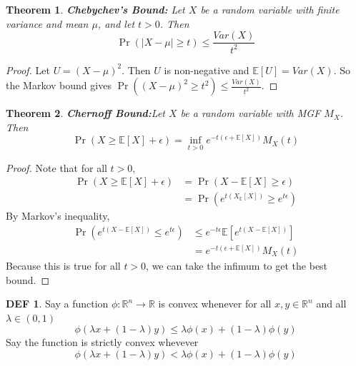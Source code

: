 \documentclass{article}
\newtheorem{theorem}{Theorem}
\theoremstyle{definition}\newtheorem{definition}{DEF}
\theoremstyle{definition}\newtheorem{example}{Ex}
\theoremstyle{lemma}\newtheorem{lemma}{Lemma}
\theoremstyle{corrolary}\newtheorem{corrolary}{Cor}
\begin{document}
\begin{theorem}
\textbf{Chebychev's Bound:}
Let $X$ be a random variable with finite variance and mean $\mu$, and let $t>0$.
Then
\begin{equation}
\Pr(|X-\mu|\geq t)\leq\frac{Var(X)}{t^2}
\end{equation}
\end{theorem}
\begin{proof}
Let $U=(X-\mu)^2$.
Then $U$ is non-negative and $\mathbb{E}[U]=Var(X)$.
So the Markov bound gives $\Pr((X-\mu)^2\geq t^2)\leq \frac{Var(X)}{t^2}$.
\end{proof}

\begin{theorem}
\textbf{Chernoff Bound:}\label{chernoff}
Let $X$ be a random variable with MGF $M_X$.
Then
\begin{equation}
\Pr(X\geq \mathbb{E}[X]+\epsilon)=\inf_{t>0} e^{-t(\epsilon + \mathbb{E}[X])}M_X(t)
\end{equation}
\end{theorem}
\begin{proof}
Note that for all $t>0$,
\begin{align*}
\Pr(X\geq \mathbb{E}[X]+\epsilon )&=\Pr(X-\mathbb{E}[X]\geq \epsilon)\\
&=\Pr(e^{t(X_\mathbb{E}[X])}\geq e^{t\epsilon})
\end{align*}
By Markov's inequality,
\begin{align*}
\Pr(e^{t(X-\mathbb{E}[X])}\leq e^{t\epsilon})&\leq e^{-t\epsilon}\mathbb{E}[e^{t(X-\mathbb{E}[X])}]\\
&=e^{-t(\epsilon + \mathbb{E}[X])}M_X(t)
\end{align*}
Because this is true for all $t>0$, we can take the infimum to get the best bound.
\end{proof}

\begin{definition}
Say a function $\phi :\mathbb{R}^n \rightarrow \mathbb{R}$ is convex whenever for all $x,y\in \mathbb{R}^n$ and all $\lambda\in (0,1)$
\begin{equation}
\phi(\lambda x + (1-\lambda )y)\leq \lambda \phi(x)+(1-\lambda)\phi(y)
\end{equation}
Say the function is strictly convex whevever
\begin{equation}
\phi(\lambda x + (1-\lambda)y)< \lambda \phi(x)+(1-\lambda)\phi(y)
\end{equation}
\end{definition}
\end{document}
